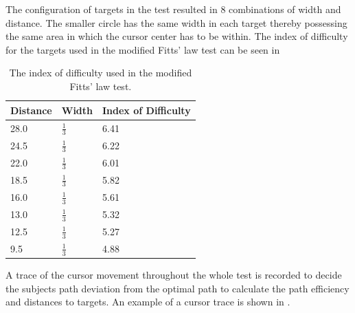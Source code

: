 The configuration of targets in the test resulted in 8 combinations of width and distance. The smaller circle has the same width in each target thereby possessing the same area in which the cursor center has to be within. The index of difficulty for the targets used in the modified Fitts' law test can be seen in 

\begin{table}[H]
	\centering
	\caption{The index of difficulty used in the modified Fitts' law test.}
	\label{tab:M:ID}
	\begin{tabular}{l|l|l}
		
		Distance & Width         & Index of Difficulty \\ \hline
		28.0     & $\frac{1}{3}$ & 6.41                \\ \hline
		24.5     & $\frac{1}{3}$ & 6.22                \\ \hline
		22.0     & $\frac{1}{3}$ & 6.01                \\ \hline
		18.5     & $\frac{1}{3}$ & 5.82                \\ \hline
		16.0     & $\frac{1}{3}$ & 5.61                \\ \hline
		13.0     & $\frac{1}{3}$ & 5.32                \\ \hline
		12.5     & $\frac{1}{3}$ & 5.27                \\ \hline
		9.5      & $\frac{1}{3}$ & 4.88                \\ \hline
	\end{tabular}
\end{table}



A trace of the cursor movement throughout the whole test is recorded to decide the subjects path deviation from the optimal path to calculate the path efficiency and distances to targets. An example of a cursor trace is shown in . 

